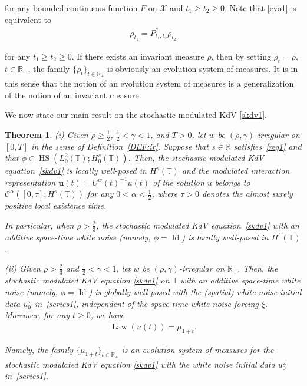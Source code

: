 \documentclass[letterpaper, 11pt,  reqno]{amsart}
\newtheorem{theorem}{Theorem} [section]
\DeclareMathOperator{\HS}{HS}
\DeclareMathOperator{\Id}{Id}
\DeclareMathOperator{\Law}{Law}
\newcommand{\1}{\hspace{0.5mm}\text{I}\hspace{0.5mm}}
\newcommand{\noi}{\noindent}
\newcommand{\R}{\mathbb{R}}
\newcommand{\T}{\mathbb{T}}
\newcommand{\al}{\alpha}
\newcommand{\g}{\gamma}
\renewcommand{\o}{\omega}
\newcommand{\cC}{\mathcal{C}}
\newcommand{\uw}{U^w}
\newcommand{\uu}{\mathbf{u}}
\numberwithin{equation}{section}
\numberwithin{theorem}{section}
\begin{document}
\noi
for any bounded continuous function $F$ on $\mathcal{X}$ and $t_1 \ge t_2 \ge 0$.
Note that \eqref{evo1} is equivalent to 
\begin{align}
 \rho_{t_1} = P^*_{t_1, t_2} \rho_{t_2} 
 \label{evo2}
\end{align}

\noi
for any $t_1 \ge t_2 \ge 0$.
If there exists an invariant measure $\rho$, 
then by setting $\rho_t = \rho$, $t \in \R_+$, 
the family $\{\rho_t\}_{t\in \R_+}$ is obviously
an evolution system of measures.
It is in this sense that the notion of an evolution system
of measures is a generalization of the notion of an invariant measure.


We now state our main result on the stochastic modulated KdV \eqref{skdv1}.

\begin{theorem}\label{THM:skdv1}
\noi
\textup{(i)}
Given $\rho \ge\frac 12$,  $\frac12< \g < 1$, and $T> 0$, 
let  $w$ be $(\rho,\g)$-irregular on $[0, T]$ in the sense of Definition~\ref{DEF:ir}.
Suppose that  $s \in \R$ satisfies~\eqref{reg1}
and that $\phi \in \HS(L^2_0(\T); H^s_0(\T))$.
Then, 
 the stochastic modulated KdV equation~\eqref{skdv1}
is locally well-posed in $H^s(\T)$
and the modulated interaction representation $\uu(t) = \uw(t)^{-1}u(t)$
of the solution $u$
belongs to 
$\cC^\al([0, \tau]; H^s(\T))$
for any $ 0 < \al < \frac 12$, 
where $\tau > 0$ denotes the almost surely positive local existence time.


In particular, when $\rho > \frac 23$, 
 the stochastic modulated KdV equation~\eqref{skdv1}
 with an additive space-time white noise \textup{(}namely, $\phi = \Id$\textup{)}
is locally well-posed in $H^s(\T)$.


\smallskip


\noi
\textup{(ii)}
Given $\rho > \frac 23$ and   $\frac12< \g < 1$, 
let  $w$ be $(\rho,\g)$-irregular on $\R_+$.
Then, 
the stochastic modulated KdV equation \eqref{skdv1}
on $\T$
 with an additive space-time white noise
 \textup{(}namely, $\phi = \Id$\textup{)}
 is globally well-posed with 
 the  \textup{(}spatial\textup{)}
 white noise initial data $u_0^\o$ in~\eqref{series1}, 
 independent of the space-time white noise forcing  $\xi$.
   Moreover, for any $t\ge 0$, 
 we have
\begin{align}
\Law (u(t)) = \mu_{1+t}.
\label{th1}
\end{align}

\noi
Namely,  the family  $\{ \mu_{1+t}\}_{t\in \R_+}$
is an evolution system of measures
for the stochastic modulated KdV equation  \eqref{skdv1} with the white noise initial data $u_0^\o$ in~\eqref{series1}.

\end{theorem}
\end{document}
